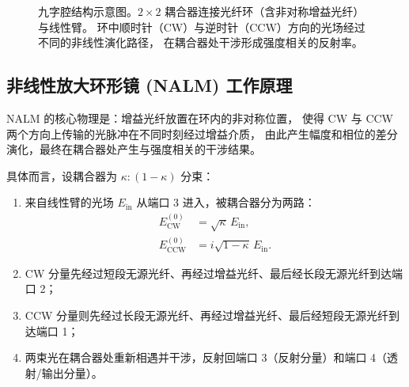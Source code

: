 \documentclass[11pt,a4paper]{ctexart}
\begin{document}
\begin{figure}[htbp]
\caption{九字腔结构示意图。$2\times2$ 耦合器连接光纤环（含非对称增益光纤）与线性臂。
环中顺时针（CW）与逆时针（CCW）方向的光场经过不同的非线性演化路径，
在耦合器处干涉形成强度相关的反射率。}
\label{fig:cavity}
\end{figure}

\subsection{非线性放大环形镜 (NALM) 工作原理}

NALM 的核心物理是：增益光纤放置在环内的非对称位置，
使得 CW 与 CCW 两个方向上传输的光脉冲在不同时刻经过增益介质，
由此产生幅度和相位的差分演化，最终在耦合器处产生与强度相关的干涉结果。

具体而言，设耦合器为 $\kappa : (1-\kappa)$ 分束：

\begin{enumerate}
  \item 来自线性臂的光场 $E_{\text{in}}$ 从端口 3 进入，被耦合器分为两路：
        \begin{align}
          E_{\text{CW}}^{(0)} &= \sqrt{\kappa}\, E_{\text{in}},\\[2pt]
          E_{\text{CCW}}^{(0)} &= i\sqrt{1-\kappa}\, E_{\text{in}}.
        \end{align}
  \item CW 分量先经过短段无源光纤、再经过增益光纤、最后经长段无源光纤到达端口 2；
  \item CCW 分量则先经过长段无源光纤、再经过增益光纤、最后经短段无源光纤到达端口 1；
  \item 两束光在耦合器处重新相遇并干涉，反射回端口 3（反射分量）和端口 4（透射/输出分量）。
\end{enumerate}
\end{document}
